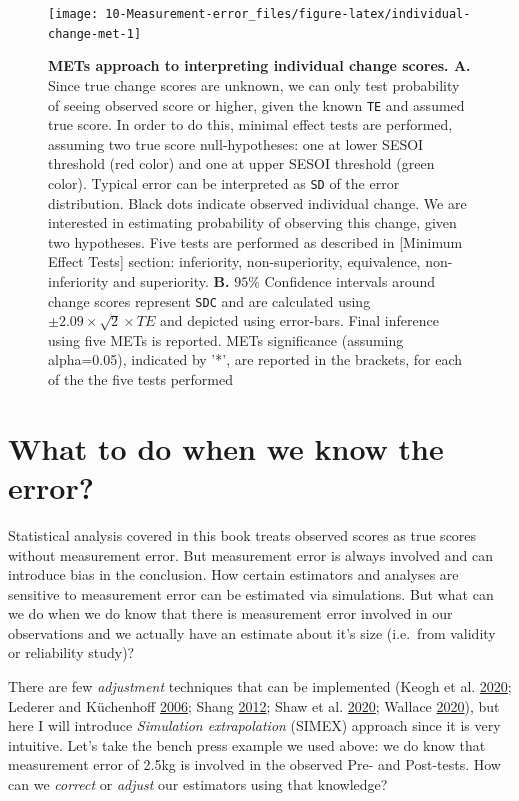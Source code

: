 \documentclass[
]{book}
\begin{document}
\begin{figure}

{\centering \texttt{[image: 10-Measurement-error\_files/figure-latex/individual-change-met-1]} 

}

\caption{\textbf{METs approach to interpreting individual change scores. A.} Since true change scores are unknown, we can only test probability of seeing observed score or higher, given the known \texttt{TE} and assumed true score. In order to do this, minimal effect tests are performed, assuming two true score null-hypotheses: one at lower SESOI threshold (red color) and one at upper SESOI threshold (green color). Typical error can be interpreted as \texttt{SD} of the error distribution. Black dots indicate observed individual change. We are interested in estimating probability of observing this change, given two hypotheses. Five tests are performed as described in {[}Minimum Effect Tests{]} section: inferiority, non-superiority, equivalence, non-inferiority and superiority. \textbf{B.} \(95\%\) Confidence intervals around change scores represent \texttt{SDC} and are calculated using \(\pm 2.09\times\sqrt{2}\times TE\) and depicted using error-bars. Final inference using five METs is reported. METs significance (assuming alpha=0.05), indicated by '*', are reported in the brackets, for each of the the five tests performed}\label{fig:individual-change-met}
\end{figure}



\hypertarget{what-to-do-when-we-know-the-error}{%
\section{What to do when we know the error?}\label{what-to-do-when-we-know-the-error}}

Statistical analysis covered in this book treats observed scores as true scores without measurement error. But measurement error is always involved and can introduce bias in the conclusion. How certain estimators and analyses are sensitive to measurement error can be estimated via simulations. But what can we do when we do know that there is measurement error involved in our observations and we actually have an estimate about it's size (i.e.~from validity or reliability study)?

There are few \emph{adjustment} techniques that can be implemented (Keogh et al. \protect\hyperlink{ref-keoghSTRATOSGuidanceDocument2020}{2020}; Lederer and Küchenhoff \protect\hyperlink{ref-LedererSimex2006}{2006}; Shang \protect\hyperlink{ref-shangMeasurementErrorAdjustment2012}{2012}; Shaw et al. \protect\hyperlink{ref-shawSTRATOSGuidanceDocument2020}{2020}; Wallace \protect\hyperlink{ref-wallaceAnalysisImperfectWorld2020}{2020}), but here I will introduce \emph{Simulation extrapolation} (SIMEX) approach since it is very intuitive. Let's take the bench press example we used above: we do know that measurement error of 2.5kg is involved in the observed Pre- and Post-tests. How can we \emph{correct} or \emph{adjust} our estimators using that knowledge?
\end{document}
